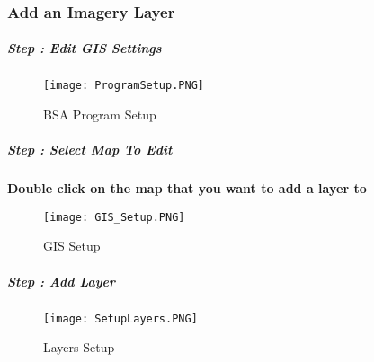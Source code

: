\subsubsection{Add an Imagery Layer}
\vspace{.25in}



\subparagraph*{{\LARGE Step \thestepCount :} Edit GIS Settings}
%
\vspace{.25in}

\vspace{.15in}

%
%
\begin{figure}[h!]
\centering
    \texttt{[image: ProgramSetup.PNG]}
\caption{BSA Program Setup}
\end{figure}
\clearpage
%
%
%

\subparagraph*{{\LARGE Step \thestepCount :} Select Map To Edit}
\vspace{.5in}

\vspace{.5in}

\noindent \textbf{Double click on the map that you want to add a layer to}
\vspace{.5in}

%
%
\begin{figure}[h!]
\centering
    \texttt{[image: GIS\_Setup.PNG]}
\caption{GIS Setup}
\end{figure}
\clearpage
%
%
%

\subparagraph*{{\LARGE Step \thestepCount :} Add Layer}

\vspace{.75in}

\vspace{.5in}
%
%
\begin{figure}[h!]
\centering
    \texttt{[image: SetupLayers.PNG]}
\caption{Layers Setup}
\end{figure}
\clearpage
%
%
%

